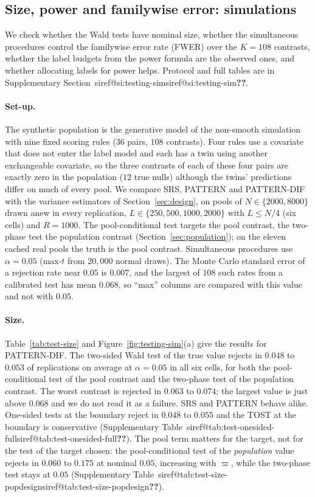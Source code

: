 \documentclass[pdflatex,sn-mathphys-num,iicol]{sn-jnl}
\makeatletter
\theoremstyle{thmstyleone}
\theoremstyle{thmstyletwo}
\theoremstyle{thmstylethree}
\newcommand{\SIref}[1]{\ifcsname siref@#1\endcsname\csname siref@#1\endcsname\else\textbf{??}\fi}
\makeatother
\begin{document}
\subsection{Size, power and familywise error: simulations}\label{sec:testing-sim}

We check whether the Wald tests have nominal size, whether the simultaneous procedures control the familywise error rate (FWER) over the $K=108$ contrasts, whether the label budgets from the power formula are the observed ones, and whether allocating labels for power helps. Protocol and full tables are in Supplementary Section~\SIref{si:testing-sim}.

\paragraph{Set-up.} The synthetic population is the generative model of the non-smooth simulation with nine fixed scoring rules ($36$ pairs, $108$ contrasts). Four rules use a covariate that does not enter the label model and each has a twin using another exchangeable covariate, so the three contrasts of each of these four pairs are exactly zero in the population ($12$ true nulls) although the twins' predictions differ on much of every pool. We compare SRS, PATTERN and PATTERN-DIF with the variance estimators of Section~\ref{sec:design}, on pools of $N\in\{2000,8000\}$ drawn anew in every replication, $L\in\{250,500,1000,2000\}$ with $L\le N/4$ (six cells) and $R=1000$. The pool-conditional test targets the pool contrast, the two-phase test the population contrast (Section~\ref{sec:population}); on the eleven cached real pools the truth is the pool contrast. Simultaneous procedures use $\alpha=0.05$ (max-$t$ from $20{,}000$ normal draws). The Monte Carlo standard error of a rejection rate near $0.05$ is $0.007$, and the largest of $108$ such rates from a calibrated test has mean $0.068$, so ``max'' columns are compared with this value and not with $0.05$.

\paragraph{Size.} Table~\ref{tab:test-size} and Figure~\ref{fig:testing-sim}(a) give the results for PATTERN-DIF. The two-sided Wald test of the true value rejects in $0.048$ to $0.053$ of replications on average at $\alpha=0.05$ in all six cells, for both the pool-conditional test of the pool contrast and the two-phase test of the population contrast. The worst contrast is rejected in $0.063$ to $0.074$; the largest value is just above $0.068$ and we do not read it as a failure. SRS and PATTERN behave alike. One-sided tests at the boundary reject in $0.048$ to $0.055$ and the TOST at the boundary is conservative (Supplementary Table~\SIref{tab:test-onesided-full}). The pool term matters for the target, not for the test of the target chosen: the pool-conditional test of the \emph{population} value rejects in $0.060$ to $0.175$ at nominal $0.05$, increasing with $\varpi$, while the two-phase test stays at $0.05$ (Supplementary Table~\SIref{tab:test-size-popdesign}).
\end{document}
